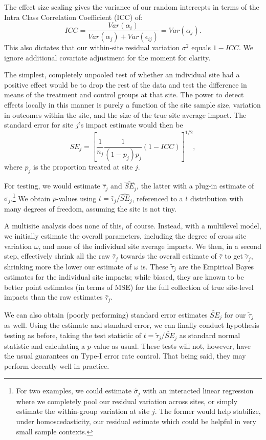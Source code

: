 \documentclass[]{article}
\begin{document}
The effect size scaling gives the variance of our random intercepts in terms of the Intra Class Correlation Coefficient (ICC) of:
$$ ICC = \frac{Var(\alpha_i)}{Var(\alpha_j) + Var(\epsilon_{ij})} = Var(\alpha_j).$$
This also dictates that our within-site residual variation $\sigma^2$ equals $1-ICC$.
We ignore additional covariate adjustment for the moment for clarity.

The simplest, completely unpooled test of whether an individual site had a positive effect would be to drop the rest of the data and test the difference in means of the treatment and control groups at that site.
The power to detect effects locally in this manner is purely a function of the site sample size, variation in outcomes within the site, and the size of the true site average impact.
The standard error for site $j$'s impact estimate would then be
$$ SE_j = \left[ \frac{1}{n_j} \frac{1}{(1-p_j)p_j} (1-ICC) \right]^{1/2} , $$ 
where $p_j$ is the proportion treated at site $j$.

For testing, we would estimate $\hat{\tau}_j$ and $\widehat{SE}_j$, the latter with a plug-in estimate of $\hat{\sigma}_j$.\footnote{For two examples, we could estimate $\hat{\sigma}_j$ with an interacted linear regression where we completely pool our residual variation across sites, or simply estimate the within-group variation at site $j$.
The former would help stabilize, under homoscedasticity, our residual estimate which could be helpful in very small sample contexts.}
We obtain $p$-values using $t = \hat{\tau}_j / \widehat{SE}_j$, referenced to a $t$ distribution with many degrees of freedom, assuming the site is not tiny.

A multisite analysis does none of this, of course.
Instead, with a multilevel model, we initially estimate the overall parameters, including the degree of cross site variation $\omega$, and none of the individual site average impacts.
We then, in a second step, effectively shrink all the raw $\hat{\tau}_j$ towards the overall estimate of $\hat{\tau}$ to get $\tilde{\tau}_j$, shrinking more the lower our estimate of $\omega$ is.
These $\tilde{\tau}_j$ are the Empirical Bayes estimates for the individual site impacts; while biased, they are known to be better point estimates (in terms of MSE) for the full collection of true site-level impacts than the raw estimates $\hat{\tau}_j$.

We can also obtain (poorly performing) standard error estimates $\tilde{SE}_j$ for our $\tilde{\tau}_j$ as well.
Using the estimate and standard error, we can finally conduct hypothesis testing as before, taking the test statistic of $t = \tilde{\tau}_j / \tilde{SE}_j$ as standard normal statistic and calculating a $p$-value as usual.
These tests will not, however, have the usual guarantees on Type-I error rate control.
That being said, they may perform decently well in practice.
\end{document}
